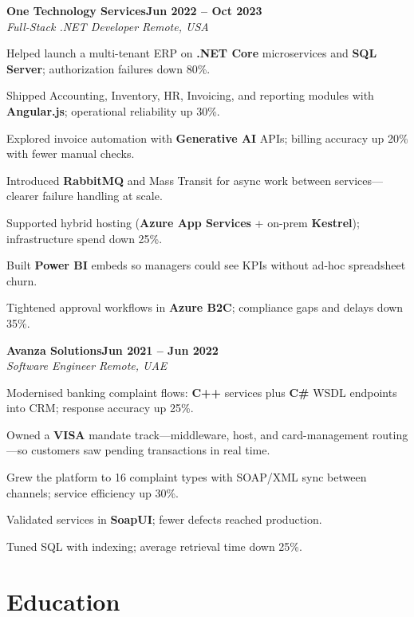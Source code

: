 \documentclass[letterpaper,10pt]{article}
\newcommand{\headingBf}[2]{
  \hspace{10pt}\textbf{#1}\hfill\textbf{#2}\\
}
\newcommand{\headingIt}[2]{
  \hspace{10pt}\textit{#1}\hfill\textit{#2}\\
}
\newenvironment{resume_list}{
  \vspace{-7pt}
  \begin{itemize}[itemsep=-2px, parsep=1pt, leftmargin=30pt]
}{
  \end{itemize}
}
\begin{document}
\headingBf{One Technology Services}{Jun 2022 -- Oct 2023}
\headingIt{Full-Stack .NET Developer \hfill Remote, USA}{}
\begin{resume_list}
    \item Helped launch a multi-tenant ERP on \textbf{.NET Core} microservices and \textbf{SQL Server}; authorization failures down 80\%.
    \item Shipped Accounting, Inventory, HR, Invoicing, and reporting modules with \textbf{Angular.js}; operational reliability up 30\%.
    \item Explored invoice automation with \textbf{Generative AI} APIs; billing accuracy up 20\% with fewer manual checks.
    \item Introduced \textbf{RabbitMQ} and Mass Transit for async work between services---clearer failure handling at scale.
    \item Supported hybrid hosting (\textbf{Azure App Services} + on-prem \textbf{Kestrel}); infrastructure spend down 25\%.
    \item Built \textbf{Power BI} embeds so managers could see KPIs without ad-hoc spreadsheet churn.
    \item Tightened approval workflows in \textbf{Azure B2C}; compliance gaps and delays down 35\%.
\end{resume_list}

\headingBf{Avanza Solutions}{Jun 2021 -- Jun 2022}
\headingIt{Software Engineer \hfill Remote, UAE}{}
\begin{resume_list}
    \item Modernised banking complaint flows: \textbf{C++} services plus \textbf{C\#} WSDL endpoints into CRM; response accuracy up 25\%.
    \item Owned a \textbf{VISA} mandate track---middleware, host, and card-management routing---so customers saw pending transactions in real time.
    \item Grew the platform to 16 complaint types with SOAP/XML sync between channels; service efficiency up 30\%.
    \item Validated services in \textbf{SoapUI}; fewer defects reached production.
    \item Tuned SQL with indexing; average retrieval time down 25\%.
\end{resume_list}


\section{Education}
\end{document}
